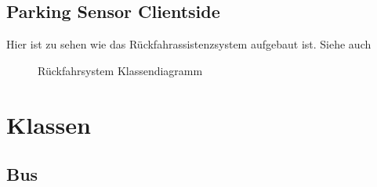 \documentclass[entwurf.tex]{subfiles}
\begin{document}
  	\section{Parking Sensor Clientside}
		Hier ist zu sehen wie das Rückfahrassistenzsystem aufgebaut ist. Siehe auch %
		\begin{figure}[H]
  			\caption{Rückfahrsystem Klassendiagramm}
  		\end{figure}
  	
  	
\chapter{Klassen}
	\section{Bus}
\end{document}
